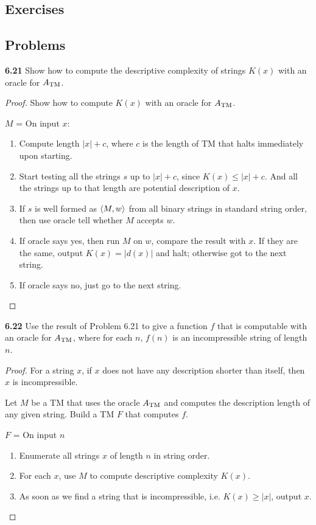 \subsection{Exercises}

\subsection{Problems}
\textbf{6.21} Show how to compute the descriptive complexity of strings $K(x)$ with an oracle for $A_{\text{TM}}$.

\begin{mdframed}
\begin{proof}
Show how to compute $K(x)$ with an oracle for $A_{\text{TM}}$.

\medskip
$M$ = On input $x$:
\begin{enumerate}
\item Compute length $|x| + c$, where $c$ is the length of TM that halts immediately upon starting.
\item Start testing all the strings $s$ up to $|x| + c$, since $K(x) \leq |x| + c$. And all the strings up to that length are potential description of $x$.
\item If $s$ is well formed as $\langle{M, w}\rangle$ from all binary strings in standard string order, then use oracle tell whether $M$ accepts $w$.
\item If oracle says yes, then run $M$ on $w$, compare the result with $x$. If they are the same, output $K(x) = |d(x)|$ and halt; otherwise got to the next string.
\item If oracle says no, just go to the next string.
\end{enumerate}\textbf{}
\end{proof}
\end{mdframed}

\textbf{6.22} Use the result of Problem 6.21 to give a function $f$ that is computable with an oracle for $A_{\text{TM}}$, where for each $n$, $f(n)$ is an incompressible string of length $n$.
\begin{mdframed}
\begin{proof}
For a string $x$, if $x$ does not have any description shorter than itself, then $x$ is incompressible.

Let $M$ be a TM that uses the oracle $A_{\text{TM}}$ and computes the description length of any given string. Build a TM $F$ that computes $f$.

\medskip
$F$ = On input $n$
\begin{enumerate}
\item Enumerate all strings $x$ of length $n$ in string order.
\item For each $x$, use $M$ to compute descriptive complexity $K(x)$.
\item As soon as we find a string that is incompressible, i.e. $K(x) \geq |x|$, output $x$.
\end{enumerate}
\end{proof}
\end{mdframed}

